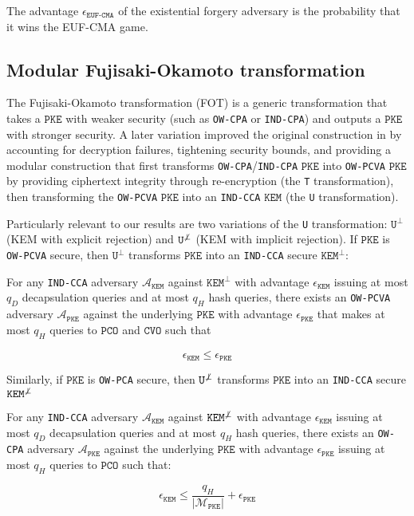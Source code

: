 \documentclass[floatrow,journal=tches,submission]{iacrtrans}
\newcommand{\pke}{\texttt{PKE}}
\newcommand{\kem}{\texttt{KEM}}
\newcommand{\pco}{\texttt{PCO}}
\newcommand{\cvo}{\texttt{CVO}}
\newcommand{\norm}[1]{\left\lvert #1 \right\rvert}
\begin{document}
The advantage $\epsilon_\texttt{EUF-CMA}$ of the existential forgery adversary is the probability that it wins the EUF-CMA game.

\subsection{Modular Fujisaki-Okamoto transformation}
The Fujisaki-Okamoto transformation (FOT) \cite{fujisaki1999secure} is a generic transformation that takes a $\pke$ with weaker security (such as \texttt{OW-CPA} or \texttt{IND-CPA}) and outputs a $\pke$ with stronger security. A later variation \cite{hofheinz2017modular} improved the original construction in \cite{fujisaki1999secure} by accounting for decryption failures, tightening security bounds, and providing a modular construction that first transforms \texttt{OW-CPA}/\texttt{IND-CPA} $\pke$ into \texttt{OW-PCVA} $\pke$ by providing ciphertext integrity through re-encryption (the \texttt{T} transformation), then transforming the \texttt{OW-PCVA} $\pke$ into an \texttt{IND-CCA} $\kem$ (the \texttt{U} transformation).


Particularly relevant to our results are two variations of the \texttt{U} transformation: $\texttt{U}^\bot$ (KEM with explicit rejection) and $\texttt{U}^{\not\bot}$ (KEM with implicit rejection). If $\pke$ is \texttt{OW-PCVA} secure, then $\texttt{U}^\bot$ transforms $\pke$ into an \texttt{IND-CCA} secure $\kem^\bot$:

\begin{theorem}\label{thm:u-bot}
    For any \texttt{IND-CCA} adversary $\mathcal{A}_\kem$ against $\kem^\bot$ with advantage $\epsilon_\kem$ issuing at most $q_D$ decapsulation queries and at most $q_H$ hash queries, there exists an \texttt{OW-PCVA} adversary $\mathcal{A}_\pke$ against the underlying $\pke$ with advantage $\epsilon_\pke$ that makes at most $q_H$ queries to $\pco$ and $\cvo$ such that

    \begin{equation*}
        \epsilon_\kem \leq \epsilon_\pke
    \end{equation*}
\end{theorem}

Similarly, if $\pke$ is \texttt{OW-PCA} secure, then $\texttt{U}^{\not\bot}$ transforms $\pke$ into an \texttt{IND-CCA} secure $\kem^{\not\bot}$

\begin{theorem}\label{thm:u-notbot}
    For any \texttt{IND-CCA} adversary $\mathcal{A}_\kem$ against $\kem^{\not\bot}$ with advantage $\epsilon_\kem$ issuing at most $q_D$ decapsulation queries and at most $q_H$ hash queries, there exists an \texttt{OW-CPA} adversary $\mathcal{A}_\pke$ against the underlying $\pke$ with advantage $\epsilon_\pke$ issuing at most $q_H$ queries to $\pco$ such that:

    \begin{equation*}
        \epsilon_\kem \leq \frac{q_H}{\norm{\mathcal{M}_\pke}} + \epsilon_\pke
    \end{equation*}
\end{theorem}
\end{document}
